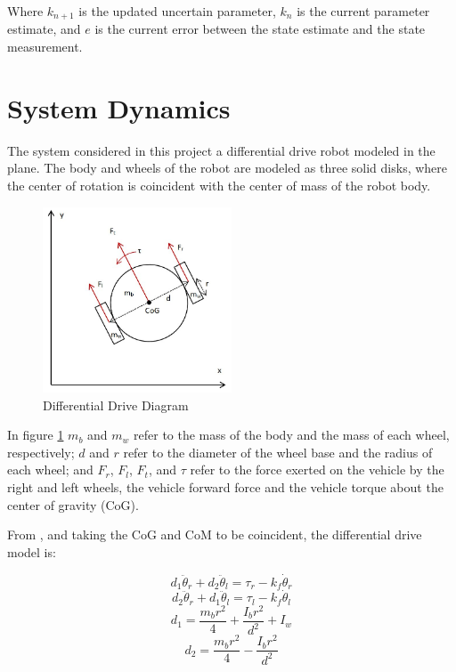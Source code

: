 \documentclass[letterpaper,12pt]{report}
\begin{document}
Where $k_{n+1}$ is the updated uncertain parameter, $k_n$ is the current parameter estimate, and $e$ is the current error between 
the state estimate and the state measurement.

\section{System Dynamics}

The system considered in this project a differential drive robot modeled in the plane. The body and wheels of the robot are modeled as three solid disks,
where the center of rotation is coincident with the center of mass of the robot body.

\begin{figure}[h]
	\centering
	\includegraphics[width=0.5\textwidth]{Kinematics1.jpg}
	\caption{Differential Drive Diagram}
	\label{fig:ddDiagram1}
\end{figure}

In figure \ref{fig:ddDiagram1} $m_b$ and $m_w$ refer to the mass of the body and the mass of each wheel, respectively; $d$ and $r$ refer to the diameter of the
wheel base and the radius of each wheel; and $F_r$, $F_l$, $F_t$, and $\tau$ refer to the force exerted on the vehicle by the right and left wheels, the vehicle 
forward force and the vehicle torque about the center of gravity (CoG).

From \cite{ivanjko2010}, and taking the CoG and CoM to be coincident, the differential drive model is:

\begin{equation}
d_1\ddot\theta_r + d_2\ddot\theta_l = \tau_r - k_f\dot\theta_r
\end{equation}
\begin{equation}
d_2\ddot\theta_r + d_1\ddot\theta_l = \tau_l - k_f\dot\theta_l
\end{equation}
\begin{equation}
d_1 = \frac{m_br^2}{4} + \frac{I_br^2}{d^2} + I_w
\end{equation}
\begin{equation}
d_2 = \frac{m_br^2}{4} - \frac{I_br^2}{d^2}
\end{equation}
\end{document}
